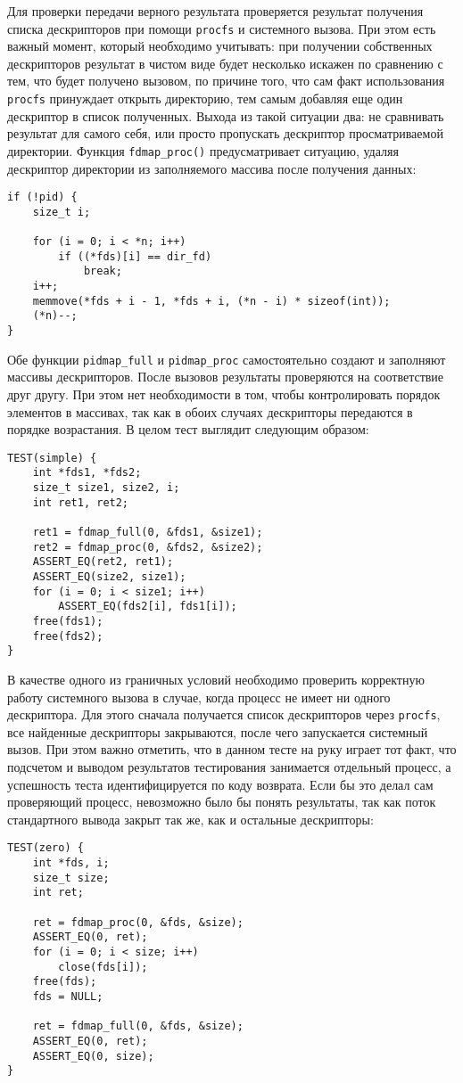 Для проверки передачи верного результата проверяется результат получения списка
дескрипторов при помощи \texttt{procfs} и системного вызова. При этом есть
важный момент, который необходимо учитывать: при получении собственных
дескрипторов результат в чистом виде будет несколько искажен по сравнению с тем,
что будет получено вызовом, по причине того, что сам факт использования
\texttt{procfs} принуждает открыть директорию, тем самым добавляя еще один
дескриптор в список полученных. Выхода из такой ситуации два: не сравнивать
результат для самого себя, или просто пропускать дескриптор просматриваемой
директории. Функция \texttt{fdmap\_proc()} предусматривает ситуацию, удаляя
дескриптор директории из заполняемого массива после получения данных:
\medskip
\begin{lstlisting}[style=cstyle]
if (!pid) {
	size_t i;

	for (i = 0; i < *n; i++)
		if ((*fds)[i] == dir_fd)
			break;
	i++;
	memmove(*fds + i - 1, *fds + i, (*n - i) * sizeof(int));
	(*n)--;
}
\end{lstlisting}
\medskip

Обе функции \texttt{pidmap\_full} и \texttt{pidmap\_proc} самостоятельно
создают и заполняют массивы дескрипторов. После вызовов результаты проверяются
на соответствие друг другу. При этом нет необходимости в том, чтобы
контролировать порядок элементов в массивах, так как в обоих случаях дескрипторы
передаются в порядке возрастания. В целом тест выглядит следующим образом:
\medskip
\begin{lstlisting}[style=cstyle]
TEST(simple) {
	int *fds1, *fds2;
	size_t size1, size2, i;
	int ret1, ret2;

	ret1 = fdmap_full(0, &fds1, &size1);
	ret2 = fdmap_proc(0, &fds2, &size2);
	ASSERT_EQ(ret2, ret1);
	ASSERT_EQ(size2, size1);
	for (i = 0; i < size1; i++)
		ASSERT_EQ(fds2[i], fds1[i]);
	free(fds1);
	free(fds2);
}
\end{lstlisting}
\medskip

В качестве одного из граничных условий необходимо проверить корректную работу
системного вызова в случае, когда процесс не имеет ни одного дескриптора. Для
этого сначала получается список дескрипторов через \texttt{procfs}, все
найденные дескрипторы закрываются, после чего запускается системный вызов. При
этом важно отметить, что в данном тесте на руку играет тот факт, что подсчетом и
выводом результатов тестирования занимается отдельный процесс, а успешность
теста идентифицируется по коду возврата. Если бы это делал сам проверяющий
процесс, невозможно было бы понять результаты, так как поток стандартного вывода
закрыт так же, как и остальные дескрипторы:
\medskip
\begin{lstlisting}[style=cstyle]
TEST(zero) {
	int *fds, i;
	size_t size;
	int ret;

	ret = fdmap_proc(0, &fds, &size);
	ASSERT_EQ(0, ret);
	for (i = 0; i < size; i++)
		close(fds[i]);
	free(fds);
	fds = NULL;

	ret = fdmap_full(0, &fds, &size);
	ASSERT_EQ(0, ret);
	ASSERT_EQ(0, size);
}
\end{lstlisting}
\medskip

